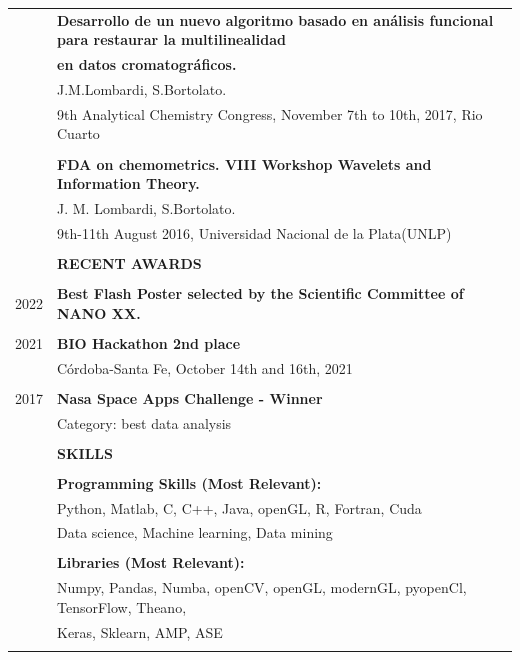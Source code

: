 \documentclass[11pt]{article}
\newcommand{\largespace}{\\[2pt]}
\newcommand{\mediumspace}{\\[-3pt]}
\newcommand{\smallspace}{\\[-5pt]}
\newcommand{\titlefont}[1]{\uppercase{\textbf{\Large{#1}}}}
\begin{document}
\begin{tcbposter}[
    poster = {columns=1, rows=1, spacing=0pt},
    boxes = {sharp corners, halign=center, valign=center, boxrule=0pt}
]
{\begin{tabular}{>{\footnotesize}rl}
        & \textbf{Desarrollo de un nuevo algoritmo basado en análisis funcional para restaurar la multilinealidad} \\
        & \textbf{en datos cromatográficos.}\\
        & J.M.Lombardi, S.Bortolato. \\
        & 9th Analytical Chemistry Congress, November 7th to 10th, 2017, Rio Cuarto\\
        & \smallspace

        & \textbf{FDA on chemometrics. VIII Workshop Wavelets and Information Theory.}\\
        & J. M. Lombardi, S.Bortolato. \\
        & 9th-11th August 2016, Universidad Nacional de la Plata(UNLP) \\
        & \largespace
               

        & \titlefont{Recent Awards} \\
        \hline \mediumspace


        2022
            & \textbf{Best Flash Poster selected by the Scientific Committee of NANO XX.} \\
            & \smallspace

        2021
            & \textbf{BIO Hackathon 2nd place} \\
            & Córdoba-Santa Fe, October 14th and 16th, 2021 \\
            & \smallspace

        2017
            & \textbf{Nasa Space Apps Challenge - Winner} \\            & Category: best data analysis \\

        & \largespace

        & \titlefont{Skills} \\
        \hline \mediumspace

        & \textbf{Programming Skills (Most Relevant):} \\
        & Python, Matlab, C, C++, Java, openGL, R, Fortran, Cuda \\
        & Data science, Machine learning, Data mining \\
        & \smallspace

        & \textbf{Libraries (Most Relevant):} \\
        & Numpy,  Pandas, Numba, openCV, openGL, modernGL, pyopenCl, TensorFlow, Theano, \\ 
        & Keras, Sklearn, AMP, ASE \\
        & \smallspace


\end{tabular}}
\end{tcbposter}
\end{document}
